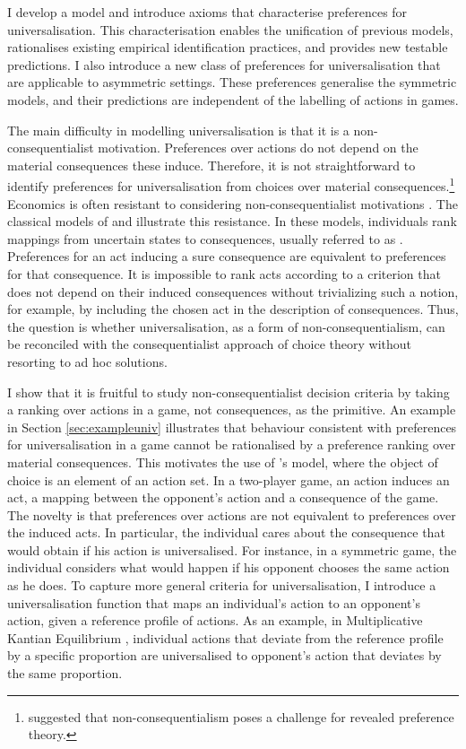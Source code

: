 I develop a model and introduce axioms that characterise preferences for universalisation. This characterisation enables the unification of previous models, rationalises existing empirical identification practices, and provides new testable predictions. I also introduce a new class of preferences for universalisation that are applicable to asymmetric settings. These preferences generalise the symmetric models, and their predictions are independent of the labelling of actions in games.

The main difficulty in modelling universalisation is that it is a non-consequentialist motivation. Preferences over actions do not depend on the material consequences these induce. Therefore, it is not straightforward to identify preferences for universalisation from choices over material consequences.\footnote{\cite{senBehaviourConceptPreference1973} suggested that non-consequentialism poses a challenge for revealed preference theory.} Economics is often resistant to considering non-consequentialist motivations \citep{fleurbaeyEconomicTheoriesJustice2019}. The classical models of \cite{anscombeDefinitionSubjectiveProbability1963} and \cite{savageFoundationsStatistics1972} illustrate this resistance. In these models, individuals rank mappings from uncertain states to consequences, usually referred to as . Preferences for an act inducing a sure consequence are equivalent to preferences for that consequence. It is impossible to rank acts according to a criterion that does not depend on their induced consequences without trivializing such a notion, for example, by including the chosen act in the description of consequences. Thus, the question is whether universalisation, as a form of non-consequentialism, can be reconciled with the consequentialist approach of choice theory without resorting to ad hoc solutions.

I show that it is fruitful to study non-consequentialist decision criteria by taking a ranking over actions in a game, not consequences, as the primitive. An example in Section \ref{sec:exampleuniv} illustrates that behaviour consistent with preferences for universalisation in a game cannot be rationalised by a preference ranking over material consequences. This motivates the use of \cite{luceGamesDecisionsIntroduction1957}'s model, where the object of choice is an element of an action set. In a two-player game, an action induces an act, a mapping between the opponent's action and a consequence of the game. The novelty is that preferences over actions are not equivalent to preferences over the induced acts. In particular, the individual cares about the consequence that would obtain if his action is universalised. For instance, in a symmetric game, the individual considers what would happen if his opponent chooses the same action as he does. To capture more general criteria for universalisation, I introduce a universalisation function that maps an individual's action to an opponent's action, given a reference profile of actions. As an example, in Multiplicative Kantian Equilibrium \citep{roemer2019we}, individual actions that deviate from the reference profile by a specific proportion are universalised to opponent's action that deviates by the same proportion.

